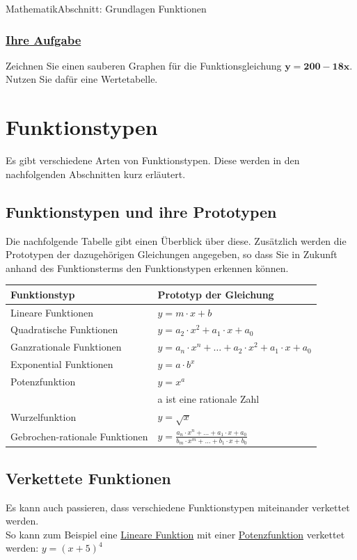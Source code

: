 \documentclass[11pt,twocolumn,oneside,openany,headings=optiontotoc,11pt,numbers=noenddot]{article}
\begin{document}
\begin{worksheet}{}{Mathematik}{Abschnitt: Grundlagen Funktionen}
		\subsubsection*{\underline{Ihre Aufgabe}}
		Zeichnen Sie einen sauberen Graphen für die Funktionsgleichung \(\mathbf{y = 200-18x}\).\\
		Nutzen Sie dafür eine Wertetabelle.
		\newpage
		\section{Funktionstypen}
		Es gibt verschiedene Arten von Funktionstypen. Diese werden in den nachfolgenden Abschnitten kurz erläutert.
		\subsection{Funktionstypen und ihre Prototypen}
		Die nachfolgende Tabelle gibt einen Überblick über diese. Zusätzlich werden die Prototypen der dazugehörigen Gleichungen angegeben, so dass Sie in Zukunft anhand des Funktionsterms den Funktionstypen erkennen können.\\
		\par\bigskip\noindent
		\begin{tabularx}{0.5\textwidth}{|X|X|}
			\hline
			\textbf{Funktionstyp} & \textbf{Prototyp der Gleichung}\\
			\hline
			Lineare Funktionen & \(y = m\cdot{}x + b\)\\
			\hline
			Quadratische Funktionen & \(y = a_2\cdot{}x^2 + a_1\cdot{}x + a_0\)\\
			\hline
			Ganzrationale Funktionen & \(y = a_n\cdot{}x^n + \ldots{} + a_2\cdot{}x^2 + a_1\cdot{}x + a_0\)\\
			\hline
			Exponential Funktionen & \(y = a\cdot{} b^x\)\\
			\hline
			Potenzfunktion & \(y = x^a\)\\
			& a ist eine rationale Zahl\\
			\hline
			Wurzelfunktion & \(y = \sqrt{x}\)\\
			\hline
			Gebrochen-rationale Funktionen & \(y = \frac{a_n\cdot{}x^n + \ldots{} + a_1\cdot{}x + a_0}{b_m\cdot{}x^m + \ldots{} + b_1\cdot{}x + b_0}\)\\
			\hline
		\end{tabularx}
		\subsection{Verkettete Funktionen}
		Es kann auch passieren, dass verschiedene Funktionstypen miteinander verkettet werden.\\
		So kann zum Beispiel eine \underline{Lineare Funktion} mit einer \underline{Potenzfunktion} verkettet werden: \(y = (x +5)^4\)
	\end{worksheet}
\end{document}
